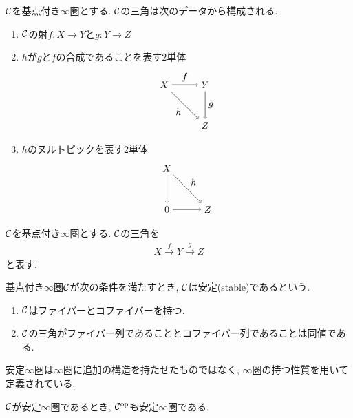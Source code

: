 \documentclass[uplatex, a4paper, 14Q, dvipdfmx]{jsarticle}
\begin{document}
\begin{remark}
  $\mathcal{C}$を基点付き$\infty$圏とする.
  $\mathcal{C}$の三角は次のデータから構成される.
  \begin{enumerate}
    \item $\mathcal{C}$の射$f : X \to Y$と$g : Y \to Z$
    \item $h$が$g$と$f$の合成であることを表す$2$単体
    \[
      \begin{tikzpicture}[auto,->]
        \node (Z) at (1.5,0) {$Z$};
        \node (X) at (0,1.5) {$X$};
        \node (Y) at (1.5,1.5) {$Y$};
        \draw (X) -- node{$f$} (Y);
        \draw (Y) -- node{$g$} (Z);
        \draw (X) -- node[swap]{$h$} (Z);
      \end{tikzpicture}
    \]
    \item $h$のヌルトピックを表す$2$単体
    \[
      \begin{tikzpicture}[auto,->]
        \node (0) at (0,0) {$0$};
        \node (Z) at (1.5,0) {$Z$};
        \node (X) at (0,1.5) {$X$};
        \draw (0) -- (Z);
        \draw (X) -- (0);
        \draw (X) -- node{$h$} (Z);
      \end{tikzpicture}
    \]
  \end{enumerate} 
\end{remark}

\begin{notation}
  $\mathcal{C}$を基点付き$\infty$圏とする.
  $\mathcal{C}$の三角を
  \begin{align*}
    X \xrightarrow{f} Y \xrightarrow{g} Z
  \end{align*}
  と表す. 
\end{notation}

\begin{definition}[安定$\infty$圏]
  基点付き$\infty$圏$\mathcal{C}$が次の条件を満たすとき, $\mathcal{C}$は安定(stable)であるという. 
  \begin{enumerate}
    \item $\mathcal{C}$はファイバーとコファイバーを持つ.
    \item $\mathcal{C}$の三角がファイバー列であることとコファイバー列であることは同値である.
  \end{enumerate}
\end{definition}

\begin{remark}
  安定$\infty$圏は$\infty$圏に追加の構造を持たせたものではなく, $\infty$圏の持つ性質を用いて定義されている. 
\end{remark}

\begin{lemma} \label{prop:Cop_is_also_stable}
  $\mathcal{C}$が安定$\infty$圏であるとき, $\mathcal{C}^{\mathrm{op}}$も安定$\infty$圏である.
\end{lemma}
\end{document}
